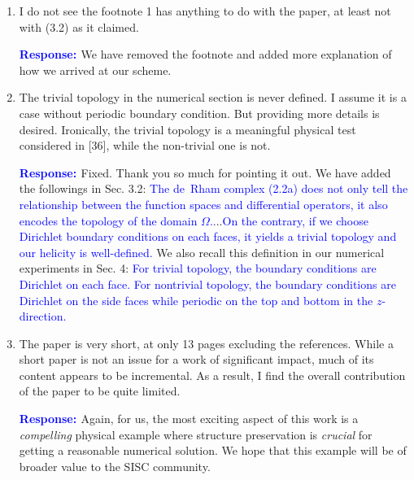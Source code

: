 \documentclass{article}
\theoremstyle{definition}
\newcommand{\rv}[1]{%
  \colorbox{gray!20}{%
    \parbox{0.96\linewidth}{%
      \small #1
    }%
  }%
}
\newcommand{\rp}{\textbf{\textcolor{blue}{Response: }}}
\newcommand{\blue}[1]{\textcolor{blue}{#1}}
\begin{document}
\begin{enumerate}
\item \rv{I do not see the footnote 1 has anything to do with the paper, at least not with (3.2) as it claimed. }

\rp We have removed the footnote and added more explanation of how we arrived at our scheme. 

\item \rv{The trivial topology in the numerical section is never defined. I assume it is a case without periodic boundary condition. But providing more details is desired. Ironically, the trivial topology is a meaningful physical test considered in [36], while the non-trivial one is not. }

\rp Fixed. Thank you so much for pointing it out. We have added the followings in Sec. 3.2: \blue{The de~Rham complex (2.2a) does not only tell the relationship between the function spaces and differential operators, it also encodes the topology of the domain $\Omega$.}...\blue{On the contrary, if we choose Dirichlet boundary conditions on each faces, it yields a trivial topology and our helicity is well-defined.} We also recall this definition in our numerical experiments in Sec. 4: \blue{For trivial topology, the boundary conditions are Dirichlet on each face. For nontrivial topology, the boundary conditions are Dirichlet on the side faces while periodic on the top and bottom in the $z$-direction.}

\item \rv{The paper is very short, at only 13 pages excluding the references. While a short paper is not an issue for a work of significant impact, much of its content appears to be incremental. As a result, I find the overall contribution of the paper to be quite limited.
}

\rp Again, for us, the most exciting aspect of this work is a \emph{compelling} physical example where structure preservation is \emph{crucial} for getting a reasonable numerical solution. We hope that this example will be of broader value to the SISC community.
\end{enumerate}

\clearpage


\end{document}
